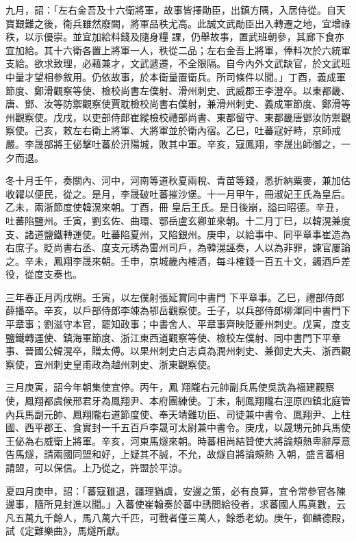 \begin{pinyinscope}
 九月，詔：「左右金吾及十六衛將軍，故事皆擇勛臣，出鎮方隅，入居侍從。自天寶艱難之後，衛兵雖然廢闕，將軍品秩尤高。此誠文武勛臣出入轉遷之地，宜增祿秩，以示優崇。並宜加給料錢及隨身糧
 課，仍舉故事，置武班朝參，其廊下食亦宜加給。其十六衛各置上將軍一人，秩從二品；左右金吾上將軍，俸料次於六統軍支給。欲求致理，必藉兼才，文武遞遷，不全限隔。自今內外文武缺官，於文武班中量才望相參敘用。仍依故事，於本衛量置衛兵。所司條件以聞。」丁酉，義成軍節度、鄭滑觀察等使、檢校尚書左僕射、滑州刺史、武威郡王李澄卒。以東都畿、唐、鄧、汝等防禦觀察使賈耽檢校尚書右僕射，兼滑州刺史、義成軍節度、鄭滑等
 州觀察使。戊戌，以吏部侍郎崔縱檢校禮部尚書、東都留守、東都畿唐鄧汝防禦觀察使。己亥，敕左右衛上將軍、大將軍並於衛內宿。乙巳，吐蕃寇好畤，京師戒嚴。李晟部將王佖擊吐蕃於汧陽城，敗其中軍。辛亥，寇鳳翔，李晟出師御之，一夕而退。



 冬十月壬午，奏關內、河中，河南等道秋夏兩稅、青苗等錢，悉折納粟麥，兼加估收糴以便民，從之。是月，李晟破吐蕃摧沙堡。十一月甲午，冊淑妃王氏為皇后。乙未，兩浙節度使韓滉來朝。丁酉，冊
 皇后王氏。是日後崩，謚曰昭德。辛丑，吐蕃陷鹽州。壬寅，劉玄佐、曲環、鄂岳盧玄卿並來朝。十二月丁巳，以韓滉兼度支、諸道鹽鐵轉運使。吐蕃陷夏州，又陷銀州。庚申，以給事中、同平章事崔造為右庶子。貶尚書右丞、度支元琇為雷州司戶，為韓滉誣奏，人以為非罪，諫官屢論之。辛未，鳳翔李晟來朝。壬申，京城畿內榷酒，每斗榷錢一百五十文，蠲酒戶差役，從度支奏也。



 三年春正月丙戌朔。壬寅，以左僕射張延賞同中書門
 下平章事。乙巳，禮部侍郎薛播卒。辛亥，以戶部侍郎李竦為鄂岳觀察使。壬子，以兵部侍郎柳渾同中書門下平章事；劉滋守本官，罷知政事；中書舍人、平章事齊映貶夔州刺史。戊寅，度支鹽鐵轉運使、鎮海軍節度、浙江東西道觀察等使、檢校左僕射、同中書門下平章事、晉國公韓滉卒，贈太傅。以果州刺史白志貞為潤州刺史、兼御史大夫、浙西觀察使，宣州刺史皇甫政為越州刺史、浙東觀察使。



 三月庚寅，詔今年朝集使宜停。丙午，鳳
 翔隴右元帥副兵馬使吳詵為福建觀察使，鳳翔都虞候邢君牙為鳳翔尹、本府團練使。丁未，制鳳翔隴右涇原四鎮北庭管內兵馬副元帥、鳳翔隴右道節度使、奉天靖難功臣、司徒兼中書令、鳳翔尹、上柱國、西平郡王、食實封一千五百戶李晟可太尉兼中書令。庚戌，以晟甥元帥兵馬使王佖為右威衛上將軍。辛亥，河東馬燧來朝。時蕃相尚結贊使大將論頰熱卑辭厚意告馬燧，請兩國同盟和好，上疑其不誠，不允，故燧自將論頰熱
 入朝，盛言蕃相請盟，可以保信。上乃從之，許盟於平涼。



 夏四月庚申，詔：「蕃寇雖退，疆理猶虞，安邊之策，必有良算，宜令常參官各陳邊事，隨所見封進以聞。」入蕃使崔翰奏於蕃中誘問給役者，求蕃國人馬真數，云凡五萬九千餘人，馬八萬六千匹，可戰者僅三萬人，餘悉老幼。庚午，御麟德殿，試《定難樂曲》，馬燧所獻。




\end{pinyinscope}
